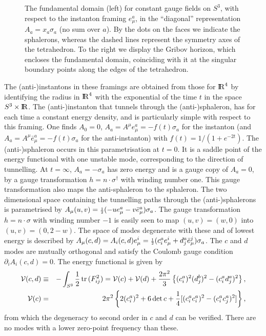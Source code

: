 \documentclass[12pt]{book}
\newcommand{\bea}{\begin{eqnarray}}
\newcommand{\eea}{\end{eqnarray}}
\newcommand{\half}{{\scriptstyle{{1\over 2}}}}
\newcommand{\real}{\relax{\rm I\kern-.18em R}}
\newcommand{\sgbar}{\sg^\dagger}
\newcommand{\tr}{\mbox{\,tr\,}}
\newcommand{\sg}{\sigma}
\newcommand{\Ss}[1]{\mbox{$\cal #1$}}
\newcommand{\pr}{\partial}
\newcommand{\site}[1]{\refnote{\cite{#1}}}
\begin{document}
\begin{figure}{\tt}
\vspace{5.5cm}
\caption{
The fundamental domain (left) for constant gauge fields on $S^3$, with respect
to the instanton framing $e_\mu^a$, in the ``diagonal'' representation
$A_a=x_a\sg_a$ (no sum over $a$). By the dots on the faces we indicate the
sphalerons, whereas the dashed lines represent the symmetry axes of the
tetrahedron. To the right we display the Gribov horizon, which encloses
the fundamental domain, coinciding with it at the singular boundary points
along the edges of the tetrahedron.}
\label{fig:fig2}
\end{figure}

The (anti-)instantons in these framings are obtained from those for $\real^4$ 
by identifying the radius in $\real^4$ with the exponential of the time $t$ 
in the space $S^3\times\real$. The (anti-)instanton that tunnels 
through the (anti-)sphaleron, has for each time a constant energy density, 
and is particularly simple with respect to this framing. One finds $A_0=0$,
$A_a=A^\mu e_\mu^a=-f(t)\sigma_a$ for the instanton (and $A_a=A^\mu 
\bar{e}_\mu^a=-f(t)\sigma_a$ for the anti-instanton) with $f(t)=1/(1+e^{-2t})$. 
The (anti-)sphaleron occurs in this parametrisation at $t=0$. It is a saddle 
point of the energy functional with one unstable mode, corresponding to the 
direction of tunnelling. At $t = \infty$, $A_a=-\sg_a$ has zero energy and is 
a gauge copy of $A_a=0$, by a gauge transformation $h=n\cdot\sgbar$ with 
winding number one. This gauge transformation also maps the anti-sphaleron to 
the sphaleron. The two dimensional space containing the tunnelling paths 
through the (anti-)sphalerons is parametrised by $A_\mu(u,v)=\half(-u e^a_\mu-
v\bar{e}^a_\mu)\sg_a$. The gauge transformation $h=n\cdot\sg$ with winding 
number $-1$ is easily seen to map $(u,v)=(w,0)$ into $(u,v)=(0,2-w)$. 
The space of modes degenerate with these and of lowest energy is described by
$A_\mu(c,d)=A_i(c,d)e_\mu^i=\half(c^a_i  e^i_\mu+d^a_j\bar{e}^j_\mu)\sg_a$.
The $c$ and $d$ modes are mutually orthogonal and satisfy the Coulomb gauge 
condition $\pr_i A_i(c,d)=0$. The energy functional is given by\site{vbda} 
\bea
  \Ss{V}(c,d)&\equiv&- \int_{S^3} \frac{1}{2} \tr(F_{ij}^2)
  = \Ss{V}(c) + \Ss{V}(d) + \frac{2 \pi^2}{3}
   \left\{ (c^a_i)^2 (d^b_j)^2 - (c^a_i d^a_j)^2 \right\},\nonumber\\
  \Ss{V}(c)&=&2 \pi^2 \left\{ 2 (c^a_i)^2 + 6 \det c + 
  \frac{1}{4}[(c^a_i c^a_i)^2 - (c^a_i c^a_j)^2 ] \right\},
\label{pot}
\eea
from which the degeneracy to second order in $c$ and $d$ can be verified. There
are no modes with a lower zero-point frequency than these\site{vbvd}.
\end{document}
